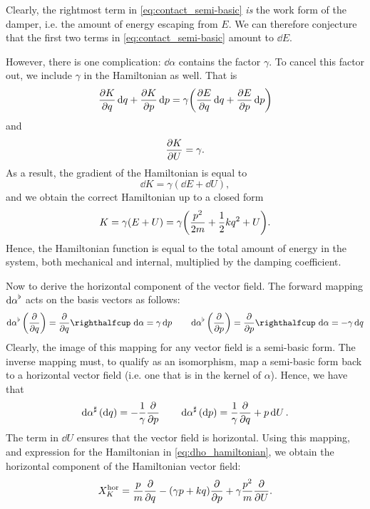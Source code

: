 Clearly, the rightmost term in \cref{eq:contact_semi-basic} \emph{is} the work form of the damper, i.e. the amount of energy escaping from $E$. We can therefore conjecture that the first two terms in \cref{eq:contact_semi-basic} amount to $\dd{E}$.

However, there is one complication: $\dd{\alpha}$ contains the factor $\gamma$. To cancel this factor out, we include $\gamma$ in the Hamiltonian as well. That is
$$ 
    \pdv{K}{q}\dd{q} + \pdv{K}{p}\dd{p} = \gamma \qty(\pdv{E}{q}\dd{q} + \pdv{E}{p}\dd{p}) $$
and 
$$ \pdv{K}{U} = \gamma. $$
As a result, the gradient of the Hamiltonian is equal to 
$$ \dd{K} = \gamma (\dd{E} + \dd{U}), $$
and we obtain the correct Hamiltonian up to a closed form
\begin{equation} 
    K = \gamma (E + U) = \gamma\qty( \frac{p^2}{2m} + \frac{1}{2}kq^2 + U). 
    \label{eq:dho_hamiltonian}
\end{equation} 
Hence, the Hamiltonian function is equal to the total amount of energy in the system, both mechanical and internal, multiplied by the damping coefficient.

Now to derive the horizontal component of the vector field. The forward mapping $\dd{\alpha}^\flat$ acts on the basis vectors as follows:
$$ \toDual{\dd{\alpha}}\qty(\pdv{}{q}) = \intpr{\pdv{}{q}}{\dd{\alpha}} = \gamma \dd{p} \qquad \toDual{\dd{\alpha}}\qty(\pdv{}{p}) = \intpr{\pdv{}{p}}{\dd{\alpha}} = -\gamma \dd{q} $$
Clearly, the image of this mapping for any vector field is a semi-basic form. The inverse mapping must, to qualify as an isomorphism, map a semi-basic form back to a horizontal vector field (i.e. one that is in the kernel of $\alpha$). Hence, we have that
$$ 
    \dd{\alpha}^\sharp\qty(\dd{q}) = -\frac{1}{\gamma} \pdv{}{p} \qquad 
    \dd{\alpha}^\sharp\qty(\dd{p}) = \frac{1}{\gamma}\pdv{}{q} +  p \dd{U}. 
$$
The term in $\dd{U}$ ensures that the vector field is horizontal. Using this mapping, and expression for the Hamiltonian in \cref{eq:dho_hamiltonian}, we obtain the horizontal component of the Hamiltonian vector field:
\begin{equation} 
    X_K^\text{hor} = \frac{p}{m}\pdv{}{q} - (\gamma p + kq)\pdv{}{p} + \gamma \frac{p^2}{m} \pdv{}{U}.
    \label{eq:dho_horizontal}
\end{equation}

